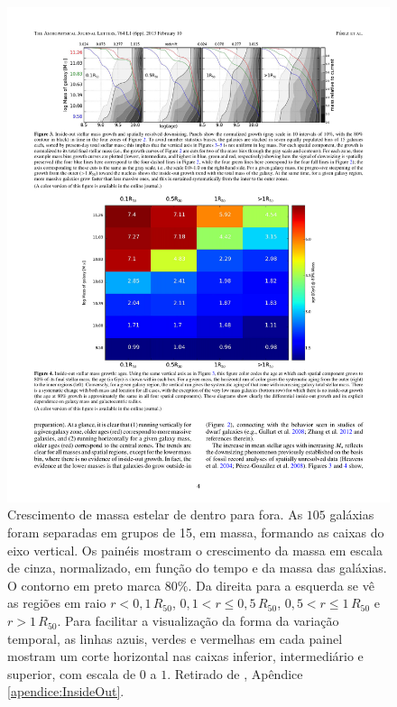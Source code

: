 \begin{figure}
	\includegraphics{figuras/inside-out}
	\caption[Crescimento da massa estelar de galáxias de dentro para fora]
	{Crescimento de massa estelar de dentro para fora. As $105$ galáxias foram
	separadas em grupos de 15, em massa, formando as caixas do eixo vertical.
	Os painéis mostram o crescimento da massa em escala de cinza, normalizado, em
	função do tempo e da massa das galáxias. O contorno em preto marca $80\%$. Da
	direita para a esquerda se vê as regiões em raio $r < 0,1\,R_{50}$, $0,1 < r
	\leq 0,5\,R_{50}$, $0,5 < r \leq 1\,R_{50}$ e $r > 1\,R_{50}$. Para
	facilitar a visualização da forma da variação temporal, as linhas azuis, verdes
	e vermelhas em cada painel mostram um corte horizontal nas caixas inferior,
	intermediário e superior, com escala de $0$ a $1$. Retirado de \citet[figura
	9]{Perez2013}, Apêndice \ref{apendice:InsideOut}.}
	\label{fig:insideOut}
\end{figure}

